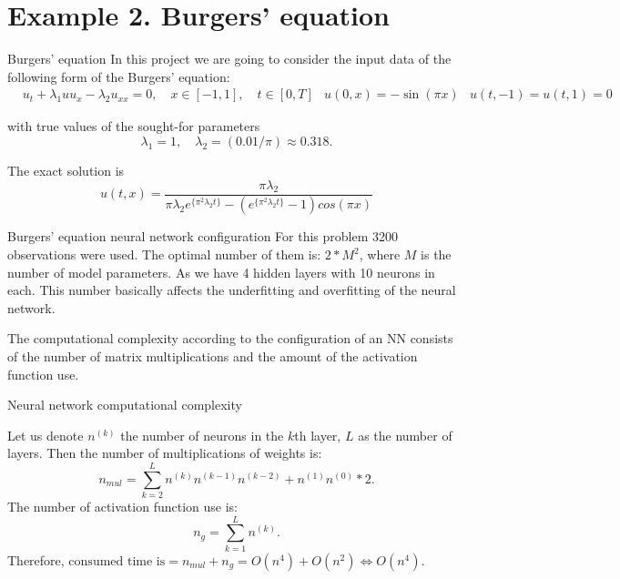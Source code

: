 \documentclass{beamer}
\def\\{}%
\begin{document}
\section{Example 2. Burgers' equation}

\begin{frame}{Burgers' equation}
In this project we are going to consider the input data of the following form of
the Burgers' equation:
\begin{align*}
&u_t + \lambda_1 u u_x - \lambda_2 u_{xx} = 0, \quad x\in[-1, 1], \quad t\in[0, T]\\
&u(0, x) = -\sin(\pi x) \\
&u(t, -1) = u(t, 1) = 0
\end{align*}

with true values of the sought-for parameters
\[
    \lambda_1 = 1,  \quad \lambda_2 = (0.01 / \pi) \approx 0.318.
\]

The exact solution is
$$u(t, x) = \frac{\pi \lambda_2}{\pi \lambda_2 e^{\{\pi^2 \lambda_2 t\}} - (e^{\{\pi^2 \lambda_2 t\}} - 1) cos(\pi x)}$$

\end{frame}

\begin{frame}{Burgers' equation neural network configuration}
    For this problem 3200 observations were used. The optimal number of them is: $2*M^2$, where $M$ is the number of model parameters. As we have 4 hidden layers with 10 neurons in each. This number basically affects the underfitting and overfitting of the neural network. \\
    
    The computational complexity according to the configuration of an NN consists of the number of matrix multiplications and the amount of the activation function use. 
    
\end{frame}

\begin{frame}{Neural network computational complexity}

    Let us denote $n^{(k)}$ the number of neurons in the $k$th layer, $L$ as the number of layers. Then the number of multiplications of weights is: $$n_{mul} = \sum_{k=2}^{L} n^{(k)}n^{(k-1)}n^{(k-2)} + n^{(1)}n^{(0)}*2.$$
    The number of activation function use is: $$n_g = \sum_{k = 1}^{L} n^{(k)}.$$ Therefore, $ \text{consumed time is} = n_{mul} + n_g = O(n^4) + O(n^2) \Longleftrightarrow O(n^4).$ 
    
\end{frame}
\end{document}
